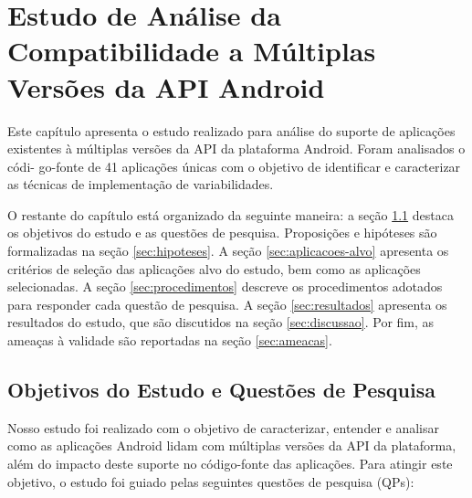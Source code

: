 \chapter{Estudo de Análise da Compatibilidade a Múltiplas Versões da API Android}
\label{ch:estudo}

Este capítulo apresenta o estudo realizado para análise do suporte de aplicações
existentes à múltiplas versões da API da plataforma Android. Foram analisados o
códi- go-fonte de 41 aplicações únicas com o objetivo de identificar e caracterizar
as técnicas de implementação de variabilidades.

O restante do capítulo está organizado da seguinte maneira: 
a seção \ref{sec:objetivos} destaca os objetivos do estudo e as questões de pesquisa.
Proposições e hipóteses são formalizadas na seção \ref{sec:hipoteses}.
A seção \ref{sec:aplicacoes-alvo} apresenta os critérios de seleção das aplicações
alvo do estudo, bem como as aplicações selecionadas.
A seção \ref{sec:procedimentos} descreve os procedimentos adotados para responder
cada questão de pesquisa. 
A seção \ref{sec:resultados} apresenta os resultados do estudo, que são discutidos na
seção \ref{sec:discussao}.
Por fim, as ameaças à validade são reportadas na seção \ref{sec:ameacas}.

\section{Objetivos do Estudo e Questões de Pesquisa} \label{sec:objetivos}

Nosso estudo foi realizado com o objetivo de caracterizar, entender e analisar
como as aplicações Android lidam com múltiplas versões da API da plataforma, além
do impacto deste suporte no código-fonte das aplicações. Para atingir este objetivo,
o estudo foi guiado pelas seguintes questões de pesquisa (QPs):

